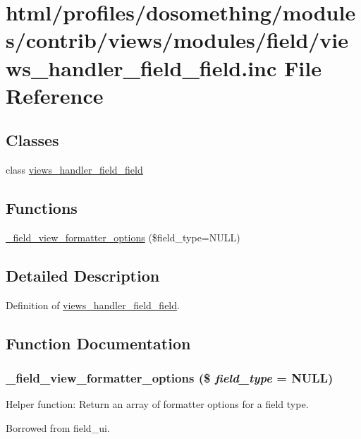 \hypertarget{views__handler__field__field_8inc}{
\section{html/profiles/dosomething/modules/contrib/views/modules/field/views\_\-handler\_\-field\_\-field.inc File Reference}
\label{views__handler__field__field_8inc}
}
\subsection*{Classes}
\begin{DoxyCompactItemize}
\item 
class \hyperlink{classviews__handler__field__field}{views\_\-handler\_\-field\_\-field}
\end{DoxyCompactItemize}
\subsection*{Functions}
\begin{DoxyCompactItemize}
\item 
\hyperlink{views__handler__field__field_8inc_a538a235c6d1985bbd2236623d836a10e}{\_\-field\_\-view\_\-formatter\_\-options} (\$field\_\-type=NULL)
\end{DoxyCompactItemize}


\subsection{Detailed Description}
Definition of \hyperlink{classviews__handler__field__field}{views\_\-handler\_\-field\_\-field}. 

\subsection{Function Documentation}
\hypertarget{views__handler__field__field_8inc_a538a235c6d1985bbd2236623d836a10e}{
\subsubsection[{\_\-field\_\-view\_\-formatter\_\-options}]{\setlength{\rightskip}{0pt plus 5cm}\_\-field\_\-view\_\-formatter\_\-options (\$ {\em field\_\-type} = {\ttfamily NULL})}}
\label{views__handler__field__field_8inc_a538a235c6d1985bbd2236623d836a10e}
Helper function: Return an array of formatter options for a field type.

Borrowed from field\_\-ui. 